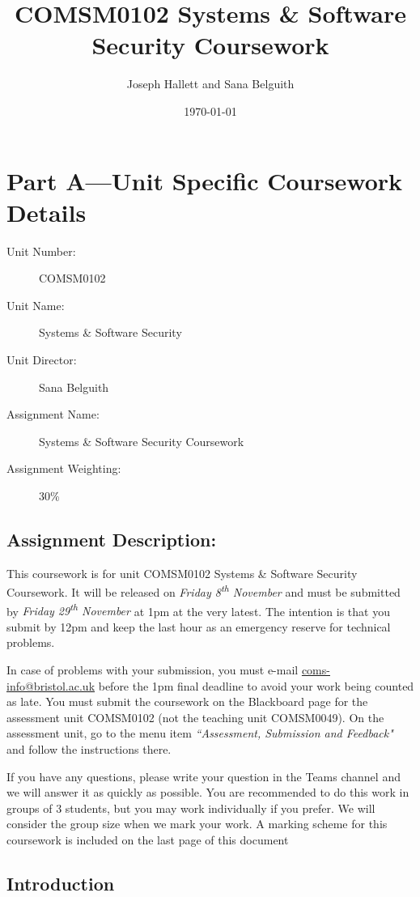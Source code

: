 \documentclass{article}
\title{COMSM0102 Systems \& Software Security Coursework}
\author{Joseph Hallett and Sana Belguith}
\date\today
\newcommand\releasedate[0]{Friday 8\textsuperscript{th} November}
\newcommand\duedate[0]{Friday 29\textsuperscript{th} November}
\begin{document}
\maketitle
\section*{Part A---Unit Specific Coursework Details}

\begin{description}
\item[Unit Number:] COMSM0102
\item[Unit Name:] Systems \& Software Security
\item[Unit Director:] Sana Belguith
\item[Assignment Name:] Systems \& Software Security Coursework
\item[Assignment Weighting:] 30\%
\end{description}

\subsection*{Assignment Description:}

This coursework is for unit COMSM0102 Systems \& Software Security
Coursework. It will be released on \emph{\releasedate} and must be
submitted by \emph{\duedate} at 1pm at the very latest. The
intention is that you submit by 12pm and keep the last hour as an
emergency reserve for technical problems.

In case of problems with your submission, you must e-mail
\href{mailto://coms-info@bristol.ac.uk}{coms-info@bristol.ac.uk}
before the 1pm final deadline to avoid your work being counted as
late. You must submit the coursework on the Blackboard page for the
assessment unit COMSM0102 (not the teaching unit COMSM0049). On the
assessment unit, go to the menu item \emph{``Assessment, Submission and
  Feedback"} and follow the instructions there.

If you have any questions, please write your question in the Teams
channel and we will answer it as quickly as possible. You are
recommended to do this work in groups of 3 students, but you may work
individually if you prefer. We will consider the group size when we mark
your work. A marking scheme for this coursework is included on the last
page of this document

\subsection*{Introduction}
\end{document}
